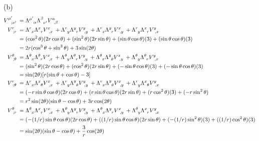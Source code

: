 \documentclass[gr-notes.tex]{subfiles}
\begin{document}
(b)
\begin{align*}
  \tensor{V}{^{\mu'}_{;\nu'}} &=
  \tensor{\Lambda}{^{\mu'}_\alpha}
  \tensor{\Lambda}{^\beta_{\nu'}}
  \tensor{V}{^\alpha_{,\beta}}
  \\
  \tensor{V}{^r_{;r}} &=
  \tensor{\Lambda}{^r_x} \tensor{\Lambda}{^x_r} \tensor{V}{^x_{,x}} +
  \tensor{\Lambda}{^r_y} \tensor{\Lambda}{^y_r} \tensor{V}{^y_{,y}} +
  \tensor{\Lambda}{^r_x} \tensor{\Lambda}{^y_r} \tensor{V}{^x_{,y}} +
  \tensor{\Lambda}{^r_y} \tensor{\Lambda}{^x_r} \tensor{V}{^y_{,x}}
  \\ &=
  (\cos^2\theta) (2r \cos\theta) +
  (\sin^2\theta) (2r \sin\theta) +
  (\sin\theta \cos\theta) (3) +
  (\sin\theta \cos\theta) (3)
  \\ &=
  2r (\cos^3\theta + \sin^3\theta) +
  3 \sin(2\theta)
  \\
  \tensor{V}{^\theta_{;\theta}} &=
  \tensor{\Lambda}{^\theta_x} \tensor{\Lambda}{^\theta_r} \tensor{V}{^x_{,x}} +
  \tensor{\Lambda}{^\theta_y} \tensor{\Lambda}{^\theta_r} \tensor{V}{^y_{,y}} +
  \tensor{\Lambda}{^\theta_x} \tensor{\Lambda}{^y_\theta} \tensor{V}{^x_{,y}} +
  \tensor{\Lambda}{^\theta_y} \tensor{\Lambda}{^\theta_r} \tensor{V}{^y_{,x}}
  \\ &=
  (\sin^2\theta) (2 r \cos\theta) + (\cos^2\theta) (2 r \sin\theta) +
  (-\sin\theta \cos\theta) (3) + (-\sin\theta \cos\theta) (3)
  \\ &=
  \sin(2\theta) [ r (\sin\theta + \cos\theta) - 3 ]
  \\
  \tensor{V}{^r_{;\theta}} &=
  \tensor{\Lambda}{^r_x} \tensor{\Lambda}{^x_\theta} \tensor{V}{^x_{,x}} +
  \tensor{\Lambda}{^r_y} \tensor{\Lambda}{^y_\theta} \tensor{V}{^y_{,y}} +
  \tensor{\Lambda}{^r_x} \tensor{\Lambda}{^y_\theta} \tensor{V}{^x_{,y}} +
  \tensor{\Lambda}{^r_y} \tensor{\Lambda}{^x_\theta} \tensor{V}{^y_{,x}}
  \\ &=
  (-r \sin\theta \cos\theta) (2 r \cos\theta) +
  (r \sin\theta \cos\theta) (2 r \sin\theta) +
  (r \cos^2\theta) (3) + (-r \sin^2\theta)
  \\ &=
  r^2 \sin(2\theta) (\sin\theta - \cos\theta) +
  3 r \cos(2 \theta)
  \\
  \tensor{V}{^\theta_{;r}} &=
  \tensor{\Lambda}{^\theta_x} \tensor{\Lambda}{^x_r} \tensor{V}{^x_{,x}} +
  \tensor{\Lambda}{^\theta_y} \tensor{\Lambda}{^y_r} \tensor{V}{^y_{,y}} +
  \tensor{\Lambda}{^\theta_x} \tensor{\Lambda}{^y_r} \tensor{V}{^x_{,y}} +
  \tensor{\Lambda}{^\theta_y} \tensor{\Lambda}{^x_r} \tensor{V}{^y_{,x}}
  \\ &=
  (-(1/r) \sin\theta \cos\theta) (2 r \cos\theta) +
  ( (1/r) \sin\theta \cos\theta) (2 r \sin\theta) +
  (-(1/r) \sin^2\theta) (3) +
  ( (1/r) \cos^2\theta) (3)
  \\ &=
  \sin(2\theta) (\sin\theta - \cos\theta) +
  \frac{3}{r} \cos(2 \theta)
\end{align*}
\end{document}

